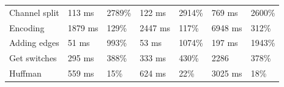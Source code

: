 \begin{table}[H]
\begin{tabular}{@{}lllllll@{}}
        Channel split           & 113 ms                                                                                    & 2789\%                                                                         & 122 ms                                                                                     & 2914\%                                                                        & 769 ms                                                                                  & 2600\%                                                                        \\
        Encoding                & 1879 ms                                                                                   & 129\%                                                                          & 2447 ms                                                                                    & 117\%                                                                         & 6948 ms                                                                                 & 312\%                                                                         \\
        Adding edges            & 51 ms                                                                                     & 993\%                                                                          & 53 ms                                                                                      & 1074\%                                                                        & 197 ms                                                                                  & 1943\%                                                                        \\
        Get switches            & 295 ms                                                                                    & 388\%                                                                          & 333 ms                                                                                     & 430\%                                                                         & 2286                                                                                    & 378\%                                                                         \\
        Huffman                 & 559 ms                                                                                    & 15\%                                                                           & 624 ms                                                                                     & 22\%                                                                          & 3025 ms                                                                                 & 18\%                                                                          \\ \midrule

\end{tabular}
\end{table}
